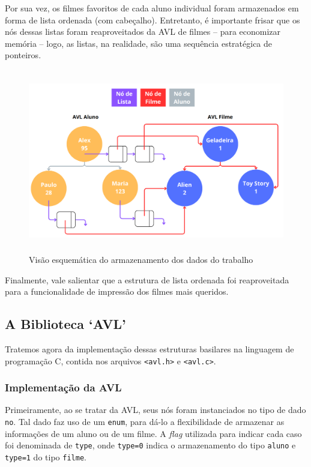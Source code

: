 \documentclass[12pt,a4paper,portuguese]{article}
\begin{document}
        Por sua vez, os filmes favoritos de cada aluno individual foram armazenados em forma de lista ordenada (com cabeçalho). Entretanto, é importante frisar que os nós dessas listas foram reaproveitados da AVL de filmes -- para economizar memória -- logo, as listas, na realidade, são uma sequência estratégica de ponteiros.
        \begin{figure}[H]
            \centering
            \includegraphics[height=8cm]{imgs/EsquemaED.png}
            \caption{Visão esquemática do armazenamento dos dados do trabalho}\label{fig:EsquemaEd}
        \end{figure}

        Finalmente, vale salientar que a estrutura de lista ordenada foi reaproveitada para a funcionalidade de impressão dos filmes mais queridos.

    \subsection{A Biblioteca `AVL'}
        Tratemos agora da implementação dessas estruturas basilares na linguagem de programação C, contida nos arquivos \verb|<avl.h>| e \verb|<avl.c>|.
    
    \subsubsection{Implementação da AVL}
        Primeiramente, ao se tratar da AVL, seus nós foram instanciados no tipo de dado \verb|no|. Tal dado faz uso de um \verb|enum|, para dá-lo a flexibilidade de armazenar as informações de um aluno ou de um filme. A \textit{flag} utilizada para indicar cada caso foi denominada de \verb|type|, onde \verb|type=0| indica o armazenamento do tipo \verb|aluno| e \verb|type=1| do tipo \verb|filme|.
\end{document}
